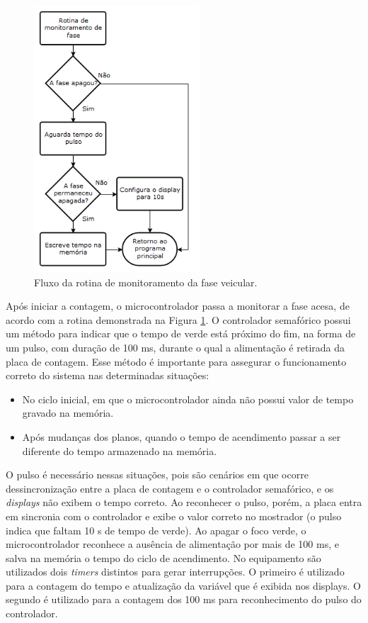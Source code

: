 \begin{figure}[ht]
    \begin{center}
    \includegraphics{figuras/fluxo_cron2.PNG}
    \end{center}
    \caption[Fluxograma do monitoramento do cronômetro]{Fluxo da rotina de monitoramento da fase veicular.}
    \label{fluxo_cron2}
\end{figure}

Após iniciar a contagem, o microcontrolador passa a monitorar a fase acesa, de acordo com a rotina demonstrada na Figura \ref{fluxo_cron2}. O controlador semafórico possui um método para indicar que o tempo de verde está próximo do fim, na forma de um pulso, com duração de 100 ms, durante o qual a alimentação é retirada da placa de contagem. Esse método é importante para assegurar o funcionamento correto do sistema nas determinadas situações:

\begin{itemize}
\item No ciclo inicial, em que o microcontrolador ainda não possui valor de tempo gravado na memória.
\item Após mudanças dos planos, quando o tempo de acendimento passar a ser diferente do tempo armazenado na memória.
\end{itemize}

O pulso é necessário nessas situações, pois são cenários em que ocorre dessincronização entre a placa de contagem e o controlador semafórico, e os \textit{displays} não exibem o tempo correto. Ao reconhecer o pulso, porém, a placa entra em sincronia com o controlador e exibe o valor correto no mostrador (o pulso indica que faltam 10 s de tempo de verde). Ao apagar o foco verde, o microcontrolador reconhece a ausência de alimentação por mais de 100 ms, e salva na memória o tempo do ciclo de acendimento.
No equipamento são utilizados dois \textit{timers} distintos para gerar interrupções. O primeiro é utilizado para a contagem do tempo e atualização da variável que é exibida nos displays. O segundo é utilizado para a contagem dos 100 ms para reconhecimento do pulso do controlador.

